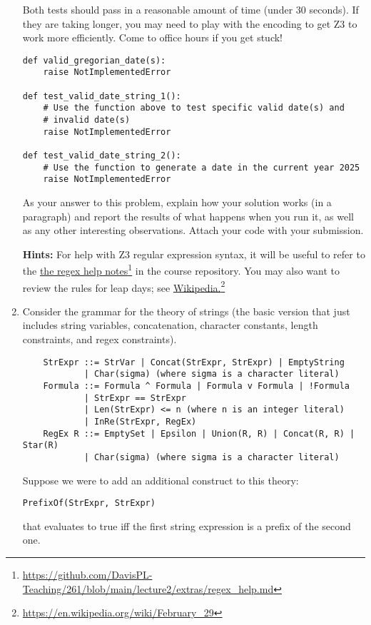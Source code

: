\documentclass{article}
\newcommand{\visiblehref}[2]{\href{#1}{#2}\footnote{\url{#1}}}
\begin{document}
\begin{enumerate}
Both tests should pass in a reasonable amount of time (under 30 seconds).
If they are taking longer, you may need to play with the encoding
to get Z3 to work more efficiently. Come to office hours if you get stuck!

\begin{verbatim}
def valid_gregorian_date(s):
    raise NotImplementedError

def test_valid_date_string_1():
    # Use the function above to test specific valid date(s) and
    # invalid date(s)
    raise NotImplementedError

def test_valid_date_string_2():
    # Use the function to generate a date in the current year 2025
    raise NotImplementedError
\end{verbatim}

As your answer to this problem, explain how your solution works (in a paragraph) and report the results of what happens when you run it, as well as any other interesting observations.
Attach your code with your submission.

\textbf{Hints:}
For help with Z3 regular expression syntax, it will be useful to refer to the \visiblehref{https://github.com/DavisPL-Teaching/261/blob/main/lecture2/extras/regex\_help.md}{the regex help notes} in the course repository.
You may also want to review the rules for leap days; see \visiblehref{https://en.wikipedia.org/wiki/February\_29}{Wikipedia.}

\item
Consider the grammar for the theory of strings (the basic version that just includes string variables, concatenation, character constants, length constraints, and regex constraints).
\begin{verbatim}
    StrExpr ::= StrVar | Concat(StrExpr, StrExpr) | EmptyString
            | Char(sigma) (where sigma is a character literal)
    Formula ::= Formula ^ Formula | Formula v Formula | !Formula
            | StrExpr == StrExpr
            | Len(StrExpr) <= n (where n is an integer literal)
            | InRe(StrExpr, RegEx)
    RegEx R ::= EmptySet | Epsilon | Union(R, R) | Concat(R, R) | Star(R)
            | Char(sigma) (where sigma is a character literal)
\end{verbatim}

Suppose we were to add an additional construct to this theory:
\begin{center}
\texttt{PrefixOf(StrExpr, StrExpr)}
\end{center}
that evaluates to true iff the first string expression is a prefix of the second one.


\end{enumerate}
\end{document}
